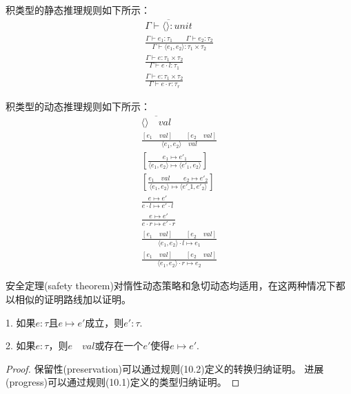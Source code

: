 
积类型的静态推理规则如下所示：
\begin{subequations}
    \begin{gather}
    \overline{\Gamma \vdash \langle \rangle : unit} \\
    \frac{\Gamma \vdash e_1: \tau_1 \qquad \Gamma \vdash e_2 : \tau_2}
         {\Gamma \vdash \langle e_1,e_2 \rangle : \tau_1 \times \tau_2} \\
    \frac{\Gamma \vdash e : \tau_1 \times \tau_2}
         {\Gamma \vdash e \cdot l : \tau_1} \\
    \frac{\Gamma \vdash e : \tau_1 \times \tau_2}
         {\Gamma \vdash e \cdot r : \tau_r}
    \end{gather}
\end{subequations}

积类型的动态推理规则如下所示：
\begin{subequations}
    \begin{gather}
    \overline{\langle \rangle \quad val} \\
    \frac{[e_1 \quad val] \qquad [e_2 \quad val]}
    {\langle e_1, e_2 \rangle \quad val} \\
    \left[\frac{e_1 \mapsto e'_{1} }
    {\langle e_1, e_2 \rangle \mapsto \langle e'_{1}, e_2 \rangle}
    \right] \\
    \left[\frac{e_1 \quad val \qquad e_2 \mapsto e'_{2} }
    {\langle e_1, e_2 \rangle \mapsto \langle e'\_{1}, e'_2 \rangle}
    \right] \\
    \frac{e \mapsto e'}{e \cdot l \mapsto e' \cdot l} \\
    \frac{e \mapsto e'}{e \cdot r \mapsto e' \cdot r} \\
    \frac{[e_1 \quad val] \qquad [e_2 \quad val]}
    {\langle e_1, e_2 \rangle \cdot l \mapsto e_1} \\
    \frac{[e_1 \quad val] \qquad [e_2 \quad val]}
    {\langle e_1, e_2 \rangle \cdot r \mapsto e_2}
    \end{gather}
\end{subequations}


安全定理(safety theorem)对惰性动态策略和急切动态均适用，在这两种情况下都以相似的证明路线加以证明。

\begin{theorem}[安全定理]\label{theorem:safety}
1. 如果$e:\tau$且$e\mapsto e'$成立，则$e':\tau$.

2. 如果$e:\tau$，则$e\quad val$或存在一个$e'$使得$e\mapsto e'$.
\end{theorem}
\begin{proof}
保留性(preservation)可以通过规则(10.2)定义的转换归纳证明。
进展(progress)可以通过规则(10.1)定义的类型归纳证明。
\end{proof}

